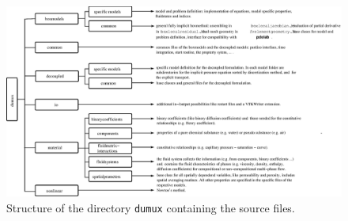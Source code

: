 \begin{landscape}
\begin{figure}[hbt]
  \centering 
  \includegraphics[width=\linewidth, keepaspectratio]{EPS/dumux_strucutre_flowchart_horizontal_explained.eps}
  \caption{
    \label{fig:dumux-structure}
    Structure of the directory \texttt{dumux} containing the \Dumux source files.
  }
\end{figure}
\end{landscape}
